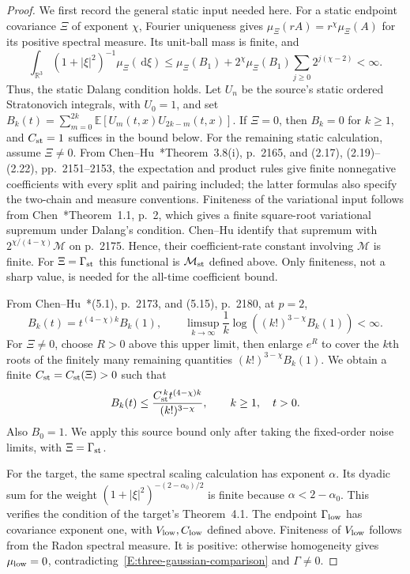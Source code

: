 \documentclass[12pt]{article}
\numberwithin{equation}{section}
\theoremstyle{definition}
\newcommand{\R}{\mathbb{R}}
\newcommand{\E}{\mathbb{E}}
\newcommand{\ud}{\,\mathrm{d}}
\begin{document}
\begin{proof}
  We first record the general static input needed here. For a static
  endpoint covariance $\Xi$ of exponent $\chi$, Fourier uniqueness
  gives $\mu_\Xi(rA)=r^\chi\mu_\Xi(A)$ for its positive spectral
  measure. Its unit-ball mass is finite, and
  \[
    \int_{\R^3}(1+|\xi|^2)^{-1}\mu_\Xi(\ud\xi)
    \le\mu_\Xi(B_1)
    +2^\chi\mu_\Xi(B_1)\sum_{j\ge0}2^{j(\chi-2)}<\infty.
  \]
  Thus, the static Dalang condition holds. Let $U_n$ be the source's
  static ordered Stratonovich integrals, with $U_0=1$, and set
  $B_k(t)=\sum_{m=0}^{2k}\E[U_m(t,x)U_{2k-m}(t,x)]$.
  If $\Xi=0$, then $B_k=0$ for $k\ge1$, and $C_{\rm st}=1$
  suffices in the bound below. For the remaining static calculation,
  assume $\Xi\ne0$. From Chen--Hu~\cite{chen.hu:25:hyperbolic}*{Theorem~3.8(i), p.~2165,
  and (2.17), (2.19)--(2.22), pp.~2151--2153}, the expectation and
  product rules give finite nonnegative coefficients with every split
  and pairing included; the latter formulas also specify the two-chain
  and measure conventions. Finiteness of
  the variational input follows from
  Chen~\cite{chen:23:exponential}*{Theorem~1.1, p.~2}, which gives a
  finite square-root variational supremum under Dalang's condition.
  Chen--Hu identify that supremum with
  $2^{\chi/(4-\chi)}\mathcal{M}$ on p.~2175. Hence, their
  coefficient-rate constant involving $\mathcal{M}$ is finite.
  For $\Xi=\Gamma_{\rm st}$ this functional is $\mathcal{M}_{\rm st}$
  defined above. Only finiteness, not a sharp value, is needed for the
  all-time coefficient bound.

  From Chen--Hu~\cite{chen.hu:25:hyperbolic}*{(5.1), p.~2173,
  and (5.15), p.~2180}, at $p=2$,
  \[
    B_k(t)=t^{(4-\chi)k}B_k(1),\qquad
    \limsup_{k\to\infty}\frac1k
    \log\left((k!)^{3-\chi}B_k(1)\right)<\infty.
  \]
  For $\Xi\ne0$, choose $R>0$ above this upper limit, then enlarge
  $e^R$ to cover the $k$th roots of the finitely many remaining
  quantities $(k!)^{3-\chi}B_k(1)$. We obtain a finite
  $C_{\rm st}=C_{\rm st}(\Xi)>0$ such that
  \begin{equation}\label{E:three-static-coefficient}
    B_k(t)\le\frac{C_{\rm st}^{\,k}t^{(4-\chi)k}}{(k!)^{3-\chi}},
    \qquad k\ge1,\quad t>0.
  \end{equation}
  Also $B_0=1$. We apply this source bound only after taking the
  fixed-order noise limits, with $\Xi=\Gamma_{\rm st}$.

  For the target, the same spectral scaling calculation has exponent
  $\alpha$. Its dyadic sum for the weight
  $(1+|\xi|^2)^{-(2-\alpha_0)/2}$ is finite because
  $\alpha<2-\alpha_0$. This verifies the condition of the target's
  Theorem~4.1. The endpoint $\Gamma_{\rm low}$ has covariance
  exponent one, with $V_{\rm low},C_{\rm low}$ defined above.
  Finiteness of $V_{\rm low}$ follows from the Radon spectral measure.
  It is positive: otherwise homogeneity gives $\mu_{\rm low}=0$,
  contradicting~\eqref{E:three-gaussian-comparison} and $\Gamma\ne0$.


\end{proof}
\end{document}
